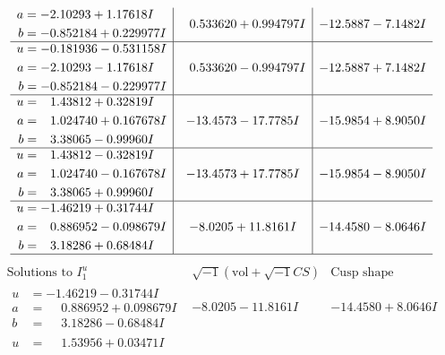 \documentclass[1p]{elsarticle_modified}
\theoremstyle{definition}
\newcommand{\I}{\sqrt{-1}}
\begin{document}
$$\begin{array}{c|c|c}
\begin{aligned}
a &= -2.10293 + 1.17618 I \\
b &= -0.852184 + 0.229977 I\end{aligned}
 & \phantom{-}0.533620 + 0.994797 I & -12.5887 - 7.1482 I \\ \hline\begin{aligned}
u &= -0.181936 - 0.531158 I \\
a &= -2.10293 - 1.17618 I \\
b &= -0.852184 - 0.229977 I\end{aligned}
 & \phantom{-}0.533620 - 0.994797 I & -12.5887 + 7.1482 I \\ \hline\begin{aligned}
u &= \phantom{-}1.43812 + 0.32819 I \\
a &= \phantom{-}1.024740 + 0.167678 I \\
b &= \phantom{-}3.38065 - 0.99960 I\end{aligned}
 & -13.4573 - 17.7785 I & -15.9854 + 8.9050 I \\ \hline\begin{aligned}
u &= \phantom{-}1.43812 - 0.32819 I \\
a &= \phantom{-}1.024740 - 0.167678 I \\
b &= \phantom{-}3.38065 + 0.99960 I\end{aligned}
 & -13.4573 + 17.7785 I & -15.9854 - 8.9050 I \\ \hline\begin{aligned}
u &= -1.46219 + 0.31744 I \\
a &= \phantom{-}0.886952 - 0.098679 I \\
b &= \phantom{-}3.18286 + 0.68484 I\end{aligned}
 & -8.0205 + 11.8161 I & -14.4580 - 8.0646 I\\
 \hline 
 \end{array}$$\newpage$$\begin{array}{c|c|c}  
\text{Solutions to }I^u_{1}& \I (\text{vol} + \sqrt{-1}CS) & \text{Cusp shape}\\
 \hline 
\begin{aligned}
u &= -1.46219 - 0.31744 I \\
a &= \phantom{-}0.886952 + 0.098679 I \\
b &= \phantom{-}3.18286 - 0.68484 I\end{aligned}
 & -8.0205 - 11.8161 I & -14.4580 + 8.0646 I \\ \hline\begin{aligned}
u &= \phantom{-}1.53956 + 0.03471 I \\

\end{aligned}
\end{array}$$
\end{document}
